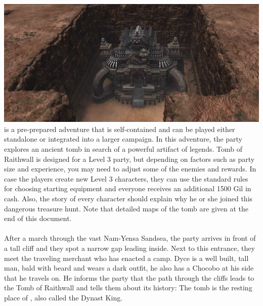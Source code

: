 %
\\\\
%
\includegraphics[width=\columnwidth]{./art/tombofraithwall/tomb1.jpg}
%
\ofpar
%
 is a pre-prepared adventure that is self-contained and can be played either standalone or integrated into a larger campaign.
In this adventure, the party explores an ancient tomb in search of a powerful artifact of legends.
Tomb of Raithwall is designed for a Level 3 party, but depending on factors such as party size and experience, you may need to adjust some of the enemies and rewards.
In case the players create new Level 3 characters, they can use the standard rules for choosing starting equipment and everyone receives an additional 1500 Gil in cash.
Also, the story of every character should explain why he or she joined this dangerous treasure hunt.
Note that detailed maps of the tomb are given at the end of this document.
%
\ofpar
%
\\\\
%
After a march through the vast Nam-Yensa Sandsea, the party arrives in front of a tall cliff and they spot a narrow gap leading inside.
Next to this entrance, they meet the traveling merchant  who has enacted a camp.
Dyce is a well built, tall man, bald with beard and wears a dark outfit, he also has a Chocobo at his side that he travels on.
He informs the party that the path through the cliffs leads to the Tomb of Raithwall and tells them about its history:
The tomb is the resting place of , also called the Dynast King.

